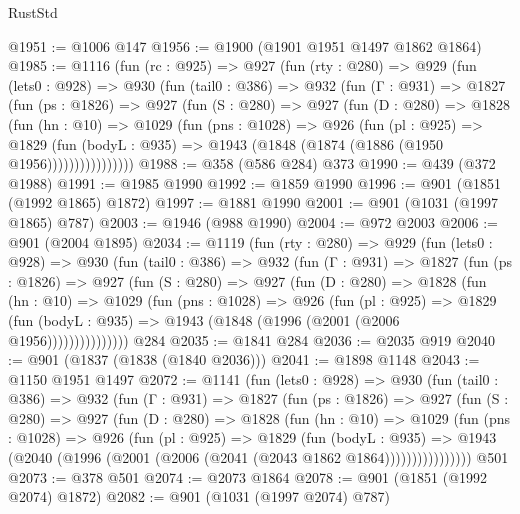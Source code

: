 \begin{lexlean}{RustStd}
\begin{coremodule}
{\begin{coremodule}
{{{{{{{{{{{{{{@1951 := @1006 @147
@1956 := @1900 (@1901 @1951 @1497 @1862 @1864)
@1985 := @1116
    (fun (rc : @925) =>
    @927
      (fun (rty : @280) =>
      @929
        (fun (lets0 : @928) =>
        @930
          (fun (tail0 : @386) =>
          @932
            (fun (Γ : @931) =>
            @1827
              (fun (ps : @1826) =>
              @927
                (fun (S : @280) =>
                @927
                  (fun (D : @280) =>
                  @1828
                    (fun (hn : @10) =>
                    @1029
                      (fun (pns : @1028) =>
                      @926
                        (fun (pl : @925) =>
                        @1829
                          (fun (bodyL : @935) =>
                          @1943 (@1848 (@1874 (@1886 (@1950 @1956))))))))))))))))
@1988 := @358 (@586 @284) @373
@1990 := @439 (@372 @1988)
@1991 := @1985 @1990
@1992 := @1859 @1990
@1996 := @901 (@1851 (@1992 @1865) @1872)
@1997 := @1881 @1990
@2001 := @901 (@1031 (@1997 @1865) @787)
@2003 := @1946 (@988 @1990)
@2004 := @972 @2003
@2006 := @901 (@2004 @1895)
@2034 := @1119
    (fun (rty : @280) =>
    @929
      (fun (lets0 : @928) =>
      @930
        (fun (tail0 : @386) =>
        @932
          (fun (Γ : @931) =>
          @1827
            (fun (ps : @1826) =>
            @927
              (fun (S : @280) =>
              @927
                (fun (D : @280) =>
                @1828
                  (fun (hn : @10) =>
                  @1029
                    (fun (pns : @1028) =>
                    @926
                      (fun (pl : @925) =>
                      @1829
                        (fun (bodyL : @935) =>
                        @1943 (@1848 (@1996 (@2001 (@2006 @1956)))))))))))))))
    @284
@2035 := @1841 @284
@2036 := @2035 @919
@2040 := @901 (@1837 (@1838 (@1840 @2036)))
@2041 := @1898 @1148
@2043 := @1150 @1951 @1497
@2072 := @1141
    (fun (lets0 : @928) =>
    @930
      (fun (tail0 : @386) =>
      @932
        (fun (Γ : @931) =>
        @1827
          (fun (ps : @1826) =>
          @927
            (fun (S : @280) =>
            @927
              (fun (D : @280) =>
              @1828
                (fun (hn : @10) =>
                @1029
                  (fun (pns : @1028) =>
                  @926
                    (fun (pl : @925) =>
                    @1829
                      (fun (bodyL : @935) =>
                      @1943 (@2040 (@1996 (@2001 (@2006 (@2041 (@2043 @1862 @1864))))))))))))))))
    @501
@2073 := @378 @501
@2074 := @2073 @1864
@2078 := @901 (@1851 (@1992 @2074) @1872)
@2082 := @901 (@1031 (@1997 @2074) @787)
}}}}}}}}}}}}}}
\end{coremodule}}
\end{coremodule}
\end{lexlean}
